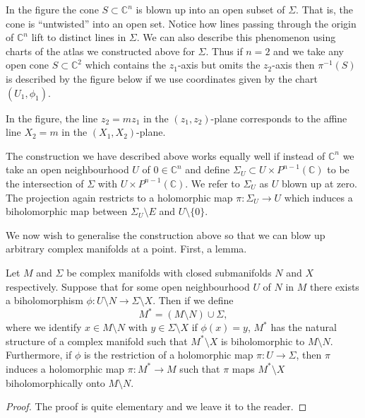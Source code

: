 \begin{center}
    \begin{minipage}{\linewidth}
        \centering
        
    \end{minipage}
\end{center}
In the figure the cone $S\subset\mathbb C^n$ is blown up into an open subset of $\Sigma$. That is, the cone is ``untwisted'' into an open set. Notice how lines passing through the origin of $\mathbb C^n$ lift to distinct lines in $\Sigma$. We can also describe this phenomenon using charts of the atlas we constructed above for $\Sigma$. Thus if $n=2$ and we take any open cone $S\subset\mathbb C^2$ which contains the $z_1$-axis but omits the $z_2$-axis then $\pi^{-1}(S)$ is described by the figure below if we use coordinates given by the chart $(U_1,\phi_1)$.

\begin{center}
    \begin{minipage}{\linewidth}
        \centering
        
    \end{minipage}
\end{center}

In the figure, the line $z_2=mz_1$ in the $(z_1,z_2)$-plane corresponds to the affine line $X_2=m$ in the $(X_1,X_2)$-plane.

The construction we have described above works equally well if instead of $\mathbb C^n$ we take an open neighbourhood $U$ of $0\in\mathbb C^n$ and define $\Sigma_U\subset U\times P^{n-1}(\mathbb C)$ to be the intersection of $\Sigma$ with $U\times P^{n-1}(\mathbb C)$. We refer to $\Sigma_U$ as $U$ blown up at zero. The projection again restricts to a holomorphic map $\pi:\Sigma_U\longrightarrow U$ which induces a biholomorphic map between $\Sigma_U\setminus E$ and $U\setminus\{0\}$.

We now wish to generalise the construction above so that we can blow up arbitrary complex manifolds at a point. First, a lemma.

 Let $M$ and $\Sigma$ be complex manifolds with closed submanifolds $N$ and $X$ respectively. Suppose that for some open neighbourhood $U$ of $N$ in $M$ there exists a biholomorphism $\phi:U\setminus N\longrightarrow\Sigma\setminus X$. Then if we define
\[
M^*=(M\setminus N)\cup\Sigma,
\]
where we identify $x\in M\setminus N$ with $y\in\Sigma\setminus X$ if $\phi(x)=y$, $M^*$ has the natural structure of a complex manifold such that $M^*\setminus X$ is biholomorphic to $M\setminus N$. Furthermore, if $\phi$ is the restriction of a holomorphic map $\pi:U\longrightarrow\Sigma$, then $\pi$ induces a holomorphic map $\pi:M^*\longrightarrow M$ such that $\pi$ maps $M^*\setminus X$ biholomorphically onto $M\setminus N$.
\begin{proof}
The proof is quite elementary and we leave it to the reader.
\end{proof}

